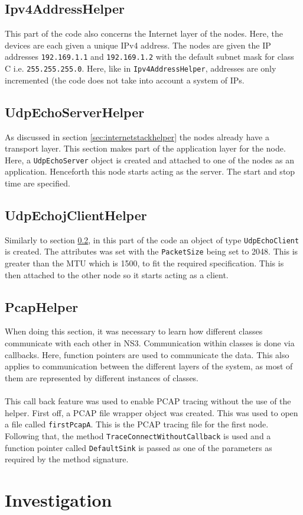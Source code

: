 \documentclass[a4paper, 12pt]{article}
\begin{document}
\subsection{Ipv4AddressHelper}
This part of the code also concerns the Internet layer of the nodes. Here, the devices are each given a unique IPv4 address. The nodes are given the IP addresses \texttt{192.169.1.1} and \texttt{192.169.1.2} with the default subnet mask for class C i.e. \texttt{255.255.255.0}. Here, like in \texttt{Ipv4AddressHelper}, addresses are only incremented (the code does not take into account a system of IPs.

\subsection{UdpEchoServerHelper}
\label{sec:udpechoserverhelper}

As discussed in section \ref{sec:internetstackhelper} the nodes already have a transport layer. This section makes part of the application layer for the node. Here, a \texttt{UdpEchoServer} object is created and attached to one of the nodes as an application. Henceforth this node starts acting as the server. The start and stop time are specified.

\subsection{UdpEchojClientHelper}
Similarly to section \ref{sec:udpechoserverhelper}, in this part of the code an object of type \texttt{UdpEchoClient} is created. The attributes was set with the \texttt{PacketSize} being set to 2048. This is greater than the MTU which is 1500, to fit the required specification. This is then attached to the other node so it starts acting as a client. 
 	
 
\subsection{PcapHelper} 
\label{sec:pcaphelper}
When doing this section, it was necessary to learn how different classes communicate with each other in NS3. Communication within classes is done via callbacks. Here, function pointers are used to communicate the data. This also applies to communication between the different layers of the system, as most of them are represented by different instances of classes.

\paragraph{}
This call back feature was used to enable PCAP tracing without the use of the helper. First off, a PCAP file wrapper object was created. This was used to open a file called \texttt{firstPcapA}. This is the PCAP tracing file for the first node.
Following that, the method \texttt{TraceConnectWithoutCallback} is used and a function pointer called \texttt{DefaultSink} is passed as one of the parameters as required by the method signature. 


\section{Investigation}
\label{section:investigation}


 
\end{document}
